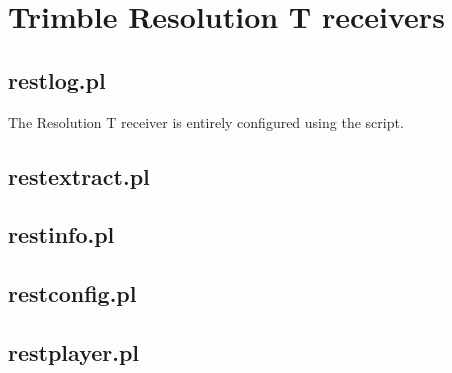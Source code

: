 \section{Trimble Resolution T receivers}

\subsection{restlog.pl}

\hypertarget{h:restlog}{}

The Resolution T receiver is entirely configured using the script.

\subsection{restextract.pl}

\hypertarget{h:restextract}{}

\subsection{restinfo.pl}

\hypertarget{h:restinfo}{}

\subsection{restconfig.pl}

\hypertarget{h:restconfig}{}

\subsection{restplayer.pl}
